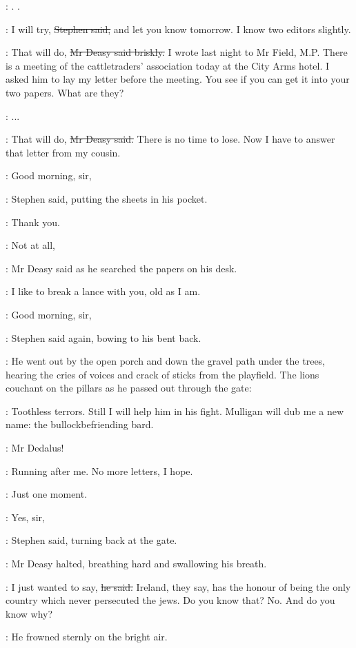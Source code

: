 \StephenInt:
.
.

\Stephen:
I will try, \sout{Stephen said,}
and let you know tomorrow.
I know two editors slightly.

\deasy:
That will do, \sout{Mr Deasy said briskly.}
I wrote last night to Mr Field, M.P.
There is a meeting of the cattletraders' association today
at the City Arms hotel.
I asked him to lay my letter before the meeting.
You see if you can get it into your two papers.
What are they?

\Stephen:
 ...

\deasy:
That will do, \sout{Mr Deasy said.}
There is no time to lose.
Now I have to answer that letter from my cousin.

\Stephen:
Good morning, sir,

:
Stephen said, putting the sheets in his pocket.

\Stephen:
Thank you.

\deasy:
Not at all,

:
Mr Deasy said as he searched the papers on his desk.

\deasy:
I like to break a lance with you, old as I am.

\Stephen:
Good morning, sir,

:
Stephen said again, bowing to his bent back.

:
He went out by the open porch and down the gravel path under the trees,
hearing the cries of voices and crack of sticks from the playfield.
The lions couchant on the pillars as he passed out through the gate:

\StephenInt:
Toothless terrors.
Still I will help him in his fight.
Mulligan will dub me a new name: the bullockbefriending bard.

\deasy:
Mr Dedalus!

\StephenInt:
Running after me.
No more letters, I hope.

\deasy:
Just one moment.

\Stephen:
Yes, sir,

:
Stephen said, turning back at the gate.

:
Mr Deasy halted, breathing hard and swallowing his breath.

\deasy:
I just wanted to say, \sout{he said.}
Ireland, they say, has the honour of being the only country
which never persecuted the jews.
Do you know that?
No.
And do you know why?

:
He frowned sternly on the bright air.

